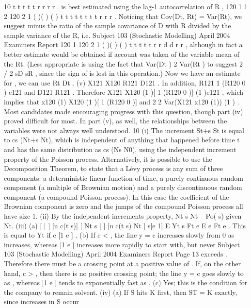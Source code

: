 10 t t t t t r r r r .
is best estimated using the lag-1 autocorrelation of R ,
120
1 1
2
120
2
1
( )( )
( )
t t t t
t
t t
t
r r
r
.
Noticing that Cov(Dt, Rt) = Var(Rt), we suggest minus the ratio of the
sample covariance of D with R divided by the sample variance of the R, i.e.
Subject 103 (Stochastic Modelling) April 2004 Examiners Report
120
1
120
2
1
( )( )
( )
t t
t
t
t
r r d d
r r
, although in fact a better estimate would be obtained
if account was taken of the variable mean of the Rt.
(Less appropriate is using the fact that Var(Dt ) 2 Var(Rt ) to suggest
2 / 2 sD sR , since the sign of is lost in this operation.)
Now we have an estimate for , we can use Rt Dt .
(v) X121 X120 R121 D121 . In addition, R121 1 (R120 0 ) e121 and
D121 R121 .
Therefore X121 X120 (1 )[ 1 (R120 0 )] (1 )e121 , which
implies that x120 (1) X120 (1 )[ 1 (R120 0 )]
and 2 2
Var(X121 x120 (1)) (1 ) .
Most candidates made encouraging progress with this question, though part (iv) proved
difficult for most. In part (v), as well, the relationships between the variables were not
always well understood.
10 (i) The increment St+s St is equal to cs (Nt+s Nt), which is independent of
anything that happened before time t and has the same distribution as
cs (Ns N0), using the independent increment property of the Poisson
process.
Alternatively, it is possible to use the Decomposition Theorem, to state that a
Lévy process is any sum of three components: a deterministic linear function
of time, a purely continuous random component (a multiple of Brownian
motion) and a purely discontinuous random component (a compound Poisson
process). In this case the coefficient of the Brownian component is zero and
the jumps of the compound Poisson process all have size 1.
(ii) By the independent increments property, Nt s Nt ~ Po( s) given Nt.
(iii) (a) [ | ] [u c(t s)] [ Nt s | ] [u c(t s) Nt ] s[e 1]
E Yt s Ft e E e Ft e .
This is equal to Yt if c [1 e ] .
(b) If c < , the line y = c increases slowly from 0 as increases,
whereas [1 e ] increases more rapidly to start with, but never
Subject 103 (Stochastic Modelling) April 2004 Examiners Report
Page 13
exceeds . Therefore there must be a crossing point at a positive value
of .
If, on the other hand, c > , then there is no positive crossing point; the
line y = c goes slowly to as , whereas [1 e ] tends to
exponentially fast as .
(c) Yes; this is the condition for the company to remain solvent.
(iv) (a) If S hits K first, then ST = K exactly, since increases in S occur
